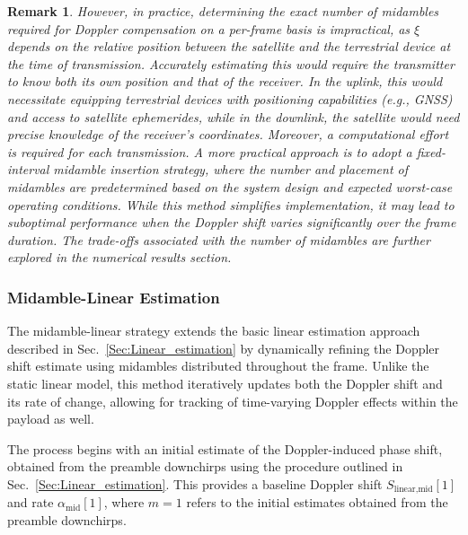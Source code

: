 \documentclass{IEEEtran}
\newtheorem{remark}{Remark}
\begin{document}
\begin{remark}
However, in practice, determining the exact number of midambles required for Doppler compensation on a per-frame basis is impractical, as $\xi$ depends on the relative position between the satellite and the terrestrial device at the time of transmission. Accurately estimating this would require the transmitter to know both its own position and that of the receiver. In the uplink, this would necessitate equipping terrestrial devices with positioning capabilities (e.g., GNSS) and access to satellite ephemerides, while in the downlink, the satellite would need precise knowledge of the receiver’s coordinates. Moreover, a computational effort is required for each transmission. A more practical approach is to adopt a fixed-interval midamble insertion strategy, where the number and placement of midambles are predetermined based on the system design and expected worst-case operating conditions. While this method simplifies implementation, it may lead to suboptimal performance when the Doppler shift varies significantly over the frame duration. The trade-offs associated with the number of midambles are further explored in the numerical results section.
\end{remark}

\subsubsection{Midamble-Linear Estimation}
The midamble-linear strategy extends the basic linear estimation approach described in Sec.~\ref{Sec:Linear_estimation} by dynamically refining the Doppler shift estimate using midambles distributed throughout the frame. Unlike the static linear model, this method iteratively updates both the Doppler shift and its rate of change, allowing for  tracking of time-varying Doppler effects within the payload as well. 


The process begins with an initial estimate of the Doppler-induced phase shift, obtained from the preamble downchirps using the procedure outlined in Sec.~\ref{Sec:Linear_estimation}. 
This provides a baseline Doppler shift $S_{\text{linear,mid}}[1]$ and rate $\alpha_{\mathrm{mid}}[1]$, where $m=1$ refers to the initial estimates obtained from the preamble downchirps. 
\end{document}
